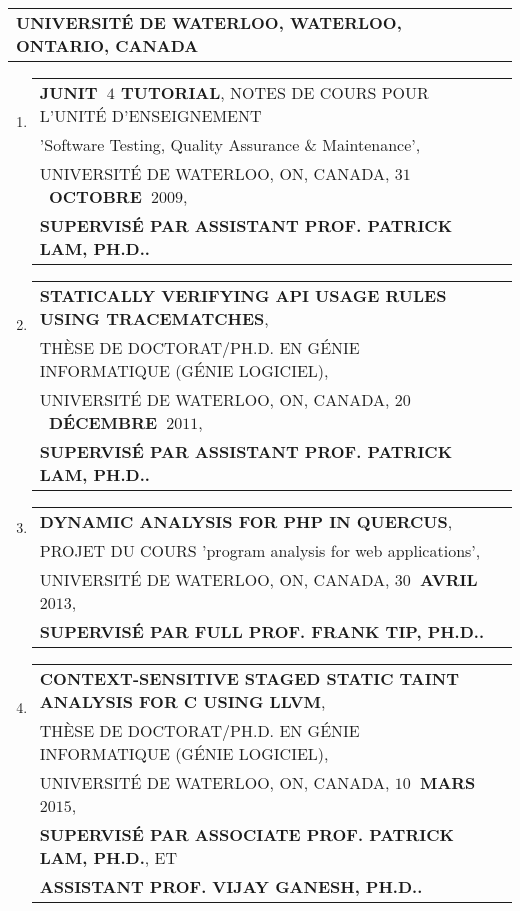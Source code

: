 \documentclass[9pt,a4paper]{article} %
\makeatletter
\newcommand{\headerrow}[2]
{\begin{tabular*}{\linewidth}{l@{\extracolsep{\fill}}r}
	#1 &
	#2 \\
\end{tabular*}}
\newcommand{\headerrowONE}[1]{\headerrow{#1}{}}
\makeatother
\begin{document}
\vspace{1em}

\headerrowONE{\textbf{UNIVERSITÉ DE WATERLOO, WATERLOO, ONTARIO, CANADA}}

\vspace{0.3em}

\begin{enumerate}
\item \headerrowONE{\textbf{JUNIT~$4$ TUTORIAL}, NOTES DE COURS POUR L'UNITÉ D'ENSEIGNEMENT \\
	'Software Testing, Quality Assurance \& Maintenance',\\
	UNIVERSITÉ DE WATERLOO, ON, CANADA, \textbf{$31$~OCTOBRE~$2009$},\\
	\textbf{SUPERVISÉ PAR ASSISTANT PROF. PATRICK LAM, PH.D..}}
 
\item \headerrowONE{\textbf{STATICALLY VERIFYING API USAGE RULES USING TRACEMATCHES},\\
	THÈSE DE DOCTORAT/PH.D. EN GÉNIE INFORMATIQUE (GÉNIE LOGICIEL),\\
	UNIVERSITÉ DE WATERLOO, ON, CANADA, \textbf{$20$~DÉCEMBRE~$2011$},\\
	\textbf{SUPERVISÉ PAR ASSISTANT PROF. PATRICK LAM, PH.D..}}

\item \headerrowONE{\textbf{DYNAMIC ANALYSIS FOR PHP IN QUERCUS},\\
	PROJET DU COURS 'program analysis for web applications',\\
	UNIVERSITÉ DE WATERLOO, ON, CANADA, \textbf{$30$~AVRIL~$2013$},\\
	\textbf{SUPERVISÉ PAR FULL PROF. FRANK TIP, PH.D..}}


\item \headerrowONE{\textbf{CONTEXT-SENSITIVE STAGED STATIC TAINT ANALYSIS FOR C USING LLVM},\\
	THÈSE DE DOCTORAT/PH.D. EN GÉNIE INFORMATIQUE (GÉNIE LOGICIEL),\\
	UNIVERSITÉ DE WATERLOO, ON, CANADA, \textbf{$10$~MARS~$2015$},\\
	\textbf{SUPERVISÉ PAR ASSOCIATE PROF. PATRICK LAM, PH.D.}, ET\\
	\textbf{ASSISTANT PROF. VIJAY GANESH, PH.D..}}
\end{enumerate}
\end{document}
